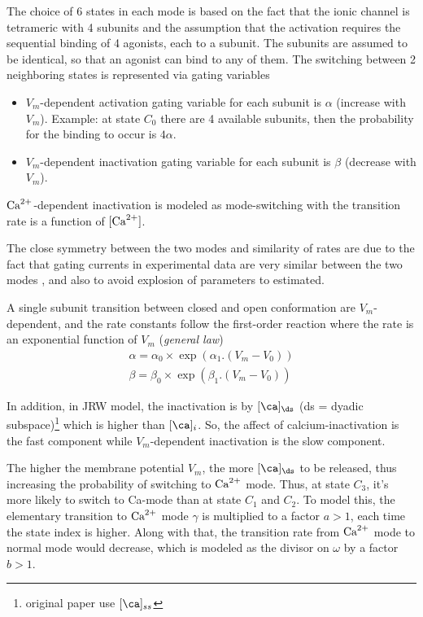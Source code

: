 The choice of 6 states in each mode is based on the fact that the ionic channel
is tetrameric with 4 subunits and the assumption that the activation requires
the sequential binding of 4 agonists, each to a subunit. The subunits are
assumed to be identical, so that an agonist can bind to any of them. The
switching between 2 neighboring states is represented via gating variables
\begin{itemize}
\item $V_m$-dependent activation gating variable for each subunit is
  $\alpha$ (increase with $V_m$). Example: at state $C_0$ there are 4
  available subunits, then the probability for the binding to occur is
  $4\alpha$.

\item $V_m$-dependent inactivation gating variable for each subunit is
  $\beta$ (decrease with $V_m$). 
\end{itemize}
${\text{Ca}^{2+}}$-dependent inactivation is modeled as mode-switching with the transition
rate is a function of $[{\text{Ca}^{2+}}]$.


\begin{framed}
  The close symmetry between the two modes and similarity of rates are
  due to the fact that gating currents in experimental data are very
  similar between the two modes \citep{hadley1991, shirokov1993cdi}, and also to
  avoid explosion of parameters to estimated.
\end{framed}

A single subunit transition between closed and open conformation are
$V_m$-dependent, and the rate constants follow the first-order reaction
where the rate is an exponential function of $V_m$ ({\it general law})
\begin{equation}
\begin{split}
\alpha = \alpha_0 \times \exp\left( \alpha_1 . (V_m - V_0) \right) \\
\beta = \beta_0 \times \exp \left( \beta_1 . (V_m - V_0) \right)
\end{split}
\end{equation}


In addition, in JRW model, the inactivation is by $[\ca]_\ds$ (ds
= dyadic subspace)\footnote{original paper use $[\ca]_{ss}$} which
is higher than $[\ca]_i$. So, the affect of calcium-inactivation
is the fast component while $V_m$-dependent inactivation is the slow component.

The higher the membrane potential $V_m$, the more $[\ca]_\ds$ to
be released, thus increasing the probability of switching to
${\text{Ca}^{2+}}$ mode. Thus, at state $C_3$, it's more likely to switch to
Ca-mode than at state $C_1$ and $C_2$. To model this, the elementary
transition to ${\text{Ca}^{2+}}$ mode $\gamma$ is multiplied to a factor
$a>1$, each time the state index is higher. Along with that, the
transition rate from ${\text{Ca}^{2+}}$ mode to normal mode would decrease,
which is modeled as the divisor on $\omega$ by a factor $b>1$. 

